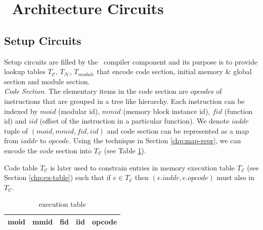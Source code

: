 \section{\zkwasm\, Architecture Circuits}
\label{chp:architecture-circuits}
\subsection{Setup Circuits}
Setup circuits are filled by the \zkwasm\, compiler component and its purpose is to provide lookup tables $T_\mathcal{C}$, $T_\mathcal{H}$, $T_{module}$ that encode code section, initial memory \& global section and module section.\\

\noindent\emph{Code Section.}
The elementary items in the code section are $opcode$s of instructions that are grouped in a tree like hierarchy. Each instruction can be indexed by $moid$ (modular id), $mmid$ (memory block instance id), $fid$ (function id) and $iid$ (offset of the instruction in a particular function). We denote $iaddr$ tuple of $(moid, mmid, fid, iid)$ and code section can be represented as a map from $iaddr$ to $opcode$. Using the technique in Section \ref{chp:map-repr}, we can encode the code section into $T_\mathcal{C}$ (see Table \ref{tbl:code-table}).

\smallskip\noindent Code table $T_\mathcal{C}$ is later used to constrain entries in memory execution table $T_\mathcal{E}$ (see Section \ref{chp:ex-table}) such that if $e \in T_\mathcal{E}$ then $(e.iaddr, e.opcode)$ must also in $T_\mathcal{C}$. 

\begin{table}[!h]
\begin{center}
\begin{tabular}{ | c | c | c | c | c | }
  \hline
  moid & mmid & fid & iid & opcode \\ 
  \hline
\end{tabular}
\caption{execution table}
\label{tbl:code-table}
\end{center}
\end{table}

